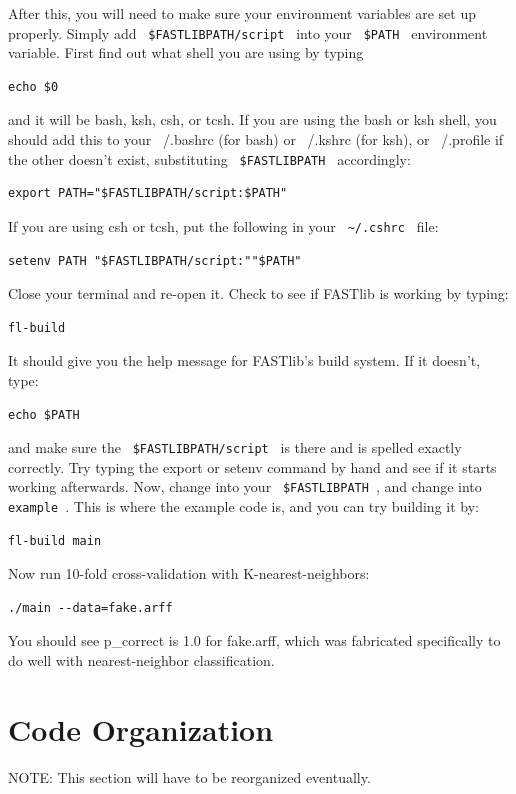 \documentclass[letter]{report}
\begin{document}
After this, you will need to make sure your environment variables are set up properly. Simply add \verb= $FASTLIBPATH/script = into your \verb= $PATH = environment variable. First find out what shell you are using by typing

\begin{verbatim}
echo $0
\end{verbatim}
and it will be bash, ksh, csh, or tcsh. If you are using the bash or ksh shell, you should add this to your ~/.bashrc (for bash) or ~/.kshrc (for ksh), or ~/.profile if the other doesn't exist, substituting \verb= $FASTLIBPATH = accordingly:

\begin{verbatim}
export PATH="$FASTLIBPATH/script:$PATH"
\end{verbatim}
If you are using csh or tcsh, put the following in your \verb= ~/.cshrc = file: 
\begin{verbatim}
setenv PATH "$FASTLIBPATH/script:""$PATH"
\end{verbatim}
Close your terminal and re-open it. Check to see if FASTlib is working by typing: 
\begin{verbatim}
fl-build 
\end{verbatim}
It should give you the help message for FASTlib's build system. If it doesn't, type:
\begin{verbatim}
echo $PATH
\end{verbatim}
and make sure the \verb= $FASTLIBPATH/script = is there and is spelled exactly correctly. Try typing the export or setenv command by hand and see if it starts working afterwards. Now, change into your \verb= $FASTLIBPATH =, and change into \verb= example =. This is where the example code is, and you can try building it by:
\begin{verbatim}
fl-build main
\end{verbatim}
Now run 10-fold cross-validation with K-nearest-neighbors:
\begin{verbatim}
./main --data=fake.arff
\end{verbatim}
You should see p\_correct is 1.0 for fake.arff, which was fabricated specifically to do well with nearest-neighbor classification. 

\section {Code Organization}
NOTE: This section will have to be reorganized eventually.
\end{document}
